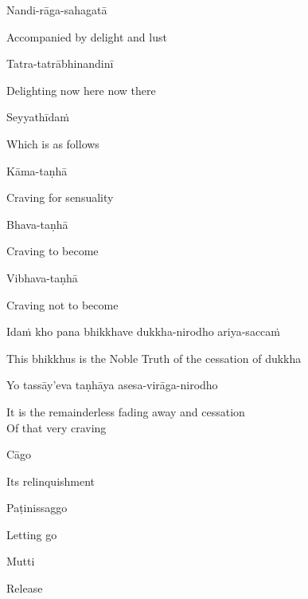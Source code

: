 Nandi-rāga-sahagatā

\begin{cprenglish}
Accompanied by delight and lust
\end{cprenglish}

Tatra-tatrābhinandinī

\begin{cprenglish}
Delighting now here now there
\end{cprenglish}

Seyyathīdaṁ

\begin{cprenglish}
Which is as follows
\end{cprenglish}

Kāma-taṇhā

\begin{cprenglish}
Craving for sensuality
\end{cprenglish}

Bhava-taṇhā

\begin{cprenglish}
Craving to become
\end{cprenglish}

Vibhava-taṇhā

\begin{cprenglish}
Craving not to become
\end{cprenglish}

Idaṁ kho pana bhikkhave dukkha-nirodho ariya-saccaṁ

\begin{cprenglish}
This bhikkhus is the Noble Truth of the cessation of dukkha
\end{cprenglish}

Yo tassāy’eva taṇhāya asesa-virāga-nirodho

\begin{cprenglish}
It is the remainderless fading away and cessation\\
Of that very craving
\end{cprenglish}

Cāgo

\begin{cprenglish}
Its relinquishment
\end{cprenglish}

Paṭinissaggo

\begin{cprenglish}
Letting go
\end{cprenglish}

Mutti

\begin{cprenglish}
Release
\end{cprenglish}

